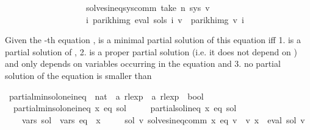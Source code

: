 \begin{isabellebody}
\ \ \ \ \ \ \ \ \ \ \ \ \ \ \ \ \ \ {\isasymand}\ solves{\isacharunderscore}{\kern0pt}ineq{\isacharunderscore}{\kern0pt}sys{\isacharunderscore}{\kern0pt}comm\ {\isacharparenleft}{\kern0pt}take\ n\ sys{\isacharparenright}{\kern0pt}\ v{\isacharprime}{\kern0pt}\isanewline
\ \ \ \ \ \ \ \ \ \ \ \ \ \ \ \ \ \ {\isasymlongrightarrow}\ {\isacharparenleft}{\kern0pt}{\isasymforall}i{\isachardot}{\kern0pt}\ parikh{\isacharunderscore}{\kern0pt}img\ {\isacharparenleft}{\kern0pt}eval\ {\isacharparenleft}{\kern0pt}sols\ i{\isacharparenright}{\kern0pt}\ v{\isacharprime}{\kern0pt}{\isacharparenright}{\kern0pt}\ {\isasymsubseteq}\ parikh{\isacharunderscore}{\kern0pt}img\ {\isacharparenleft}{\kern0pt}v{\isacharprime}{\kern0pt}\ i{\isacharparenright}{\kern0pt}{\isacharparenright}{\kern0pt}{\isacharparenright}{\kern0pt}{\isachardoublequoteclose}%
\begin{isamarkuptext}%
Given the -th equation ,  is a minimal partial solution of this equation iff
1.  is a partial solution of ,
2.  is a proper partial solution (i.e. it does not depend on ) and only depends on variables
   occurring in the equation  and
3. no partial solution of the equation  is smaller than %
\end{isamarkuptext}\isamarkuptrue%
\isamarkupfalse%
\ partial{\isacharunderscore}{\kern0pt}min{\isacharunderscore}{\kern0pt}sol{\isacharunderscore}{\kern0pt}one{\isacharunderscore}{\kern0pt}ineq\ {\isacharcolon}{\kern0pt}{\isacharcolon}{\kern0pt}\ {\isachardoublequoteopen}nat\ {\isasymRightarrow}\ {\isacharprime}{\kern0pt}a\ rlexp\ {\isasymRightarrow}\ {\isacharprime}{\kern0pt}a\ rlexp\ {\isasymRightarrow}\ bool{\isachardoublequoteclose}\ \isanewline
\ \ {\isachardoublequoteopen}partial{\isacharunderscore}{\kern0pt}min{\isacharunderscore}{\kern0pt}sol{\isacharunderscore}{\kern0pt}one{\isacharunderscore}{\kern0pt}ineq\ x\ eq\ sol\ {\isasymequiv}\isanewline
\ \ \ \ partial{\isacharunderscore}{\kern0pt}sol{\isacharunderscore}{\kern0pt}ineq\ x\ eq\ sol\ {\isasymand}\isanewline
\ \ \ \ vars\ sol\ {\isasymsubseteq}\ vars\ eq\ {\isacharminus}{\kern0pt}\ {\isacharbraceleft}{\kern0pt}x{\isacharbraceright}{\kern0pt}\ {\isasymand}\isanewline
\ \ \ \ {\isacharparenleft}{\kern0pt}{\isasymforall}sol{\isacharprime}{\kern0pt}\ v{\isacharprime}{\kern0pt}{\isachardot}{\kern0pt}\ solves{\isacharunderscore}{\kern0pt}ineq{\isacharunderscore}{\kern0pt}comm\ x\ eq\ v{\isacharprime}{\kern0pt}\ {\isasymand}\ v{\isacharprime}{\kern0pt}\ x\ {\isacharequal}{\kern0pt}\ eval\ sol{\isacharprime}{\kern0pt}\ v{\isacharprime}{\kern0pt}\isanewline

\end{isabellebody}
